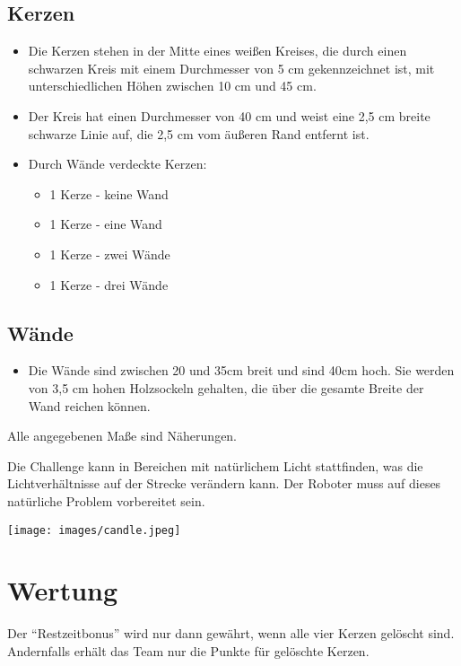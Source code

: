 \documentclass[a4paper,12pt]{article}
\begin{document}
\subsection{Kerzen}
\begin{itemize}
	\item Die Kerzen stehen in der Mitte eines weißen Kreises, die durch einen schwarzen Kreis mit einem Durchmesser von 5 cm gekennzeichnet ist, mit unterschiedlichen Höhen zwischen 10 cm und 45 cm.
	\item  Der Kreis hat einen Durchmesser von 40 cm und weist eine 2,5 cm breite schwarze Linie auf, die 2,5 cm vom äußeren Rand entfernt ist.
	\item Durch Wände verdeckte Kerzen:
	\begin{itemize}
		\item 1 Kerze - keine Wand
		\item 1 Kerze - eine Wand
		\item 1 Kerze - zwei Wände
		\item 1 Kerze - drei Wände
	\end{itemize}
\end{itemize}
\subsection{Wände}
\begin{itemize}
	\item Die Wände sind zwischen 20 und 35cm breit und sind 40cm hoch. Sie werden von 3,5 cm hohen Holzsockeln gehalten, die über die gesamte Breite der Wand reichen können.
\end{itemize}
\begin{center}
	Alle angegebenen Maße sind Näherungen.
\end{center}
Die Challenge kann in Bereichen mit natürlichem Licht stattfinden, was die Lichtverhältnisse auf der Strecke verändern kann. Der Roboter muss auf dieses natürliche
Problem vorbereitet sein.
\begin{center}
\texttt{[image: images/candle.jpeg]}
\end{center}
\section{Wertung}
Der "`Restzeitbonus"' wird nur dann gewährt, wenn alle vier Kerzen gelöscht sind.  Andernfalls erhält das Team nur die Punkte für gelöschte Kerzen.
\end{document}
